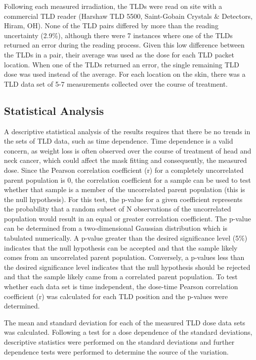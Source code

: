 Following each measured irradiation, the TLDs were read on site with a commercial TLD reader (Harshaw TLD 5500, Saint-Gobain Crystals \& Detectors, Hiram, OH). None of the TLD pairs differed by more than the reading uncertainty (2.9\%), although there were 7 instances where one of the TLDs returned an error during the reading process. Given this low difference between the TLDs in a pair, their average was used as the dose for each TLD packet location. When one of the TLDs returned an error, the single remaining TLD dose was used instead of the average. For each location on the skin, there was a TLD data set of 5-7 measurements collected over the course of treatment.

\subsection{Statistical Analysis}
A descriptive statistical analysis of the results requires that there be no trends in the sets of TLD data, such as time dependence. Time dependence is a valid concern, as weight loss is often observed over the course of treatment of head and neck cancer, which could affect the mask fitting and consequently, the measured dose. Since the Pearson correlation coefficient (r) for a completely uncorrelated parent population is 0, the correlation coefficient for a sample can be used to test whether that sample is a member of the uncorrelated parent population (this is the null hypothesis). For this test, the p-value for a given coefficient represents the probability that a random subset of N observations of the uncorrelated population would result in an equal or greater correlation coefficient. The p-value can be determined from a two-dimensional Gaussian distribution which is tabulated numerically. A p-value greater than the desired significance level (5\%) indicates that the null hypothesis can be accepted and that the sample likely comes from an uncorrelated parent population. Conversely, a p-values less than the desired significance level indicates that the null hypothesis should be rejected and that the sample likely came from a correlated parent population. To test whether each data set is time independent, the dose-time Pearson correlation coefficient (r) was calculated for each TLD position and the p-values were determined.\cite{Bevington2003}

The mean and standard deviation for each of the measured TLD dose data sets was calculated. Following a test for a dose dependence of the standard deviations, descriptive statistics were performed on the standard deviations and further dependence tests were performed to determine the source of the variation.

